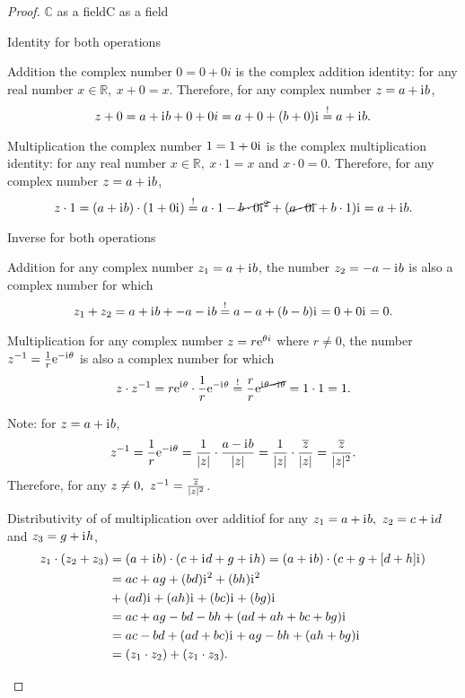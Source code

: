 \begin{proof}{$\bm{\mathbb{C}}$ as a field}{C as a field}
\begin{descitemize}
		\item[Identity for both operations]~\\
			\begin{listitemize}
			\item[Addition] the complex number $0=0+0i$ is the complex addition identity: for any real number $x\in\mathbb{R},\ x+0=x$. Therefore, for any complex number $z=a+\mathrm{i}\mkern1mu b$,
				\[
					z+0 = a+\mathrm{i}\mkern1mu b + 0+0i = a+0 + (b+0)\mathrm{i}\mkern1mu \overset{!}{=} a+\mathrm{i}\mkern1mu b.
				\]
			\item[Multiplication] the complex number $1=1+0\mathrm{i}\mkern1mu$ is the complex multiplication identity: for any real number $x\in\mathbb{R},\ x\cdot1=x$ and $x\cdot0=0$. Therefore, for any complex number $z=a+\mathrm{i}\mkern1mu b$,
				\[
					z\cdot1 = (a+\mathrm{i}\mkern1mu b)\cdot(1+0\mathrm{i}\mkern1mu) \overset{!}{=}a\cdot1-\cancel{b\cdot0\mathrm{i}\mkern1mu^{2}} + (\cancel{a\cdot0\mathrm{i}\mkern1mu}+b\cdot1)\mathrm{i}\mkern1mu = a+\mathrm{i}\mkern1mu b.
				\]

			\end{listitemize}
		
		\item[Inverse for both operations]~\\
			\begin{listitemize}
			\item[Addition] for any complex number $z_{1}=a+\mathrm{i}\mkern1mu b$, the number $z_{2}=-a-\mathrm{i}\mkern1mu b$ is also a complex number for which
				\[
					z_{1} + z_{2} = a+\mathrm{i}\mkern1mu b + -a-\mathrm{i}\mkern1mu b \overset{!}{=} a-a + (b-b)\mathrm{i}\mkern1mu = 0 + 0\mathrm{i}\mkern1mu = 0.
				\]
			\item[Multiplication] for any complex number $z=r\mathrm{e}^{\theta i}$ where $r\neq0$, the number $z^{-1}=\frac{1}{r}\mathrm{e}^{-\mathrm{i}\mkern1mu\theta}$ is also a complex number for which
				\[
					z \cdot z^{-1} = r\mathrm{e}^{\mathrm{i}\mkern1mu\theta} \cdot \frac{1}{r}\mathrm{e}^{-\mathrm{i}\mkern1mu\theta} \overset{!}{=} \frac{r}{r}\mathrm{e}^{\cancel{\mathrm{i}\mkern1mu\theta - \mathrm{i}\mkern1mu\theta}} = 1\cdot1 = 1.
				\]
				
			Note: for $z=a+\mathrm{i}\mkern1mu b$,
			\[
				z^{-1} = \frac{1}{r}\mathrm{e}^{-\mathrm{i}\mkern1mu\theta} = \frac{1}{|z|}\cdot\frac{a-\mathrm{i}\mkern1mu b}{|z|} = \frac{1}{|z|}\cdot\frac{\overline{z}}{|z|} = \frac{\overline{z}}{|z|^{2}}.
			\]
			Therefore, for any $z\neq0,\ z^{-1} = \frac{\overline{z}}{|z|^{2}}$.
			\end{listitemize}

		\item[Distributivity of of multiplication over additiof] for any $z_{1}=a+\mathrm{i}\mkern1mu b,\ z_{2}=c+\mathrm{i}\mkern1mu d$ and $z_{3}=g+\mathrm{i}\mkern1mu h$,
			\begin{align*}
				z_{1}\cdot(z_{2}+z_{3}) &= (a+\mathrm{i}\mkern1mu b)\cdot(c+\mathrm{i}\mkern1mu d + g+\mathrm{i}\mkern1mu h) = (a+\mathrm{i}\mkern1mu b)\cdot(c+g + [d+h]\mathrm{i}\mkern1mu)\\
				&= ac + ag + (bd)\mathrm{i}\mkern1mu^{2} + (bh)\mathrm{i}\mkern1mu^{2}\\
				&+ (ad)\mathrm{i}\mkern1mu + (ah)\mathrm{i}\mkern1mu + (bc)\mathrm{i}\mkern1mu + (bg)\mathrm{i}\mkern1mu\\
				&= ac + ag - bd - bh + (ad + ah + bc + bg)\mathrm{i}\mkern1mu\\
				&= ac-bd + (ad+bc)\mathrm{i}\mkern1mu + ag-bh + (ah+bg)\mathrm{i}\mkern1mu\\
				&= (z_{1}\cdot z_{2}) + (z_{1}\cdot z_{3}).
			\end{align*}
	\end{descitemize}
\end{proof}

